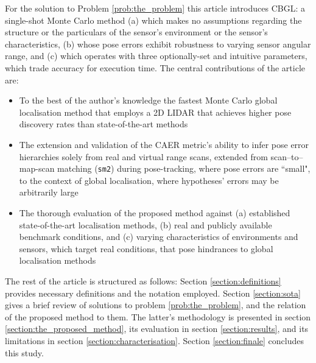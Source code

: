 For the solution to Problem \ref{prob:the_problem} this article introduces
CBGL: a single-shot Monte Carlo method
(a) which makes no assumptions regarding the structure or the particulars of the
sensor's environment or the sensor's characteristics,
(b) whose pose errors exhibit robustness to varying sensor angular range, and
(c) which operates with three optionally-set and intuitive parameters, which
trade accuracy for execution time.
The central contributions of the article are:
\begin{itemize}
  \item To the best of the author's knowledge the fastest Monte Carlo global
        localisation method that employs a 2D LIDAR that achieves higher
        pose discovery rates than state-of-the-art methods
  \item The extension and validation of the CAER metric's ability to infer
        pose error hierarchies solely from real and virtual range scans,
        extended from scan--to--map-scan matching (\texttt{sm2}) during
        pose-tracking, where pose errors are ``small", to the context of
        global localisation, where hypotheses' errors may be arbitrarily large
  \item The thorough evaluation of the proposed method against (a) established
        state-of-the-art localisation methods, (b) real and publicly available
        benchmark conditions, and (c) varying characteristics of environments
        and sensors, which target real conditions, that pose hindrances to
        global localisation methods
\end{itemize}

The rest of the article is structured as follows: Section
\ref{section:definitions} provides necessary definitions and the notation
employed. Section \ref{section:sota} gives a brief review of
solutions to problem \ref{prob:the_problem}, and the relation of the proposed
method to them. The latter's methodology is presented in section
\ref{section:the_proposed_method}, its evaluation in section
\ref{section:results}, and its limitations in section
\ref{section:characterisation}. Section \ref{section:finale} concludes this
study.
